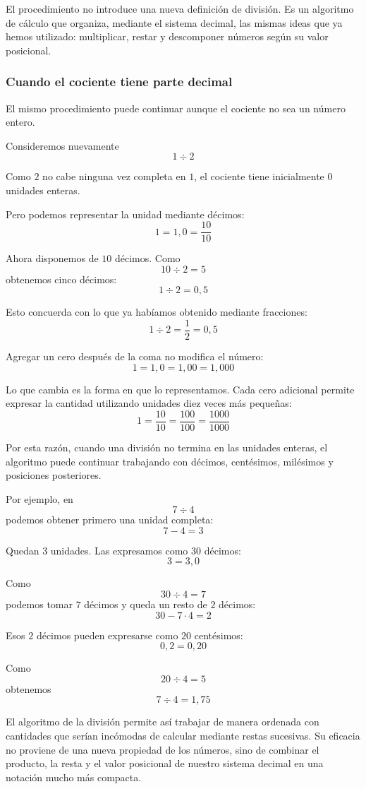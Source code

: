 El procedimiento no introduce una nueva definición de división. Es un algoritmo de cálculo que organiza, mediante el sistema decimal, las mismas ideas que ya hemos utilizado: multiplicar, restar y descomponer números según su valor posicional.

\subsubsection{Cuando el cociente tiene parte decimal}

El mismo procedimiento puede continuar aunque el cociente no sea un número entero.

Consideremos nuevamente
\[
1\div2
\]

Como \(2\) no cabe ninguna vez completa en \(1\), el cociente tiene inicialmente
\(
0
\)
unidades enteras.

Pero podemos representar la unidad mediante décimos:
\[
1=1{,}0=\frac{10}{10}
\]

Ahora disponemos de \(10\) décimos. Como
\[
10\div2=5
\]
obtenemos cinco décimos:
\[
1\div2=0{,}5
\]

Esto concuerda con lo que ya habíamos obtenido mediante fracciones:
\[
1\div2=\frac12=0{,}5
\]

Agregar un cero después de la coma no modifica el número:
\[
1=1{,}0=1{,}00=1{,}000
\]

Lo que cambia es la forma en que lo representamos. Cada cero adicional permite expresar la cantidad utilizando unidades diez veces más pequeñas:
\[
1=\frac{10}{10}
=\frac{100}{100}
=\frac{1000}{1000}
\]

Por esta razón, cuando una división no termina en las unidades enteras, el algoritmo puede continuar trabajando con décimos, centésimos, milésimos y posiciones posteriores.

Por ejemplo, en
\[
7\div4
\]
podemos obtener primero una unidad completa:
\[
7-4=3
\]

Quedan \(3\) unidades. Las expresamos como \(30\) décimos:
\[
3=3{,}0
\]

Como
\[
30\div4=7
\]
podemos tomar \(7\) décimos y queda un resto de \(2\) décimos:
\[
30-7\cdot4=2
\]

Esos \(2\) décimos pueden expresarse como \(20\) centésimos:
\[
0{,}2=0{,}20
\]

Como
\[
20\div4=5
\]
obtenemos
\[
7\div4=1{,}75
\]

El algoritmo de la división permite así trabajar de manera ordenada con cantidades que serían incómodas de calcular mediante restas sucesivas. Su eficacia no proviene de una nueva propiedad de los números, sino de combinar el producto, la resta y el valor posicional de nuestro sistema decimal en una notación mucho más compacta.

